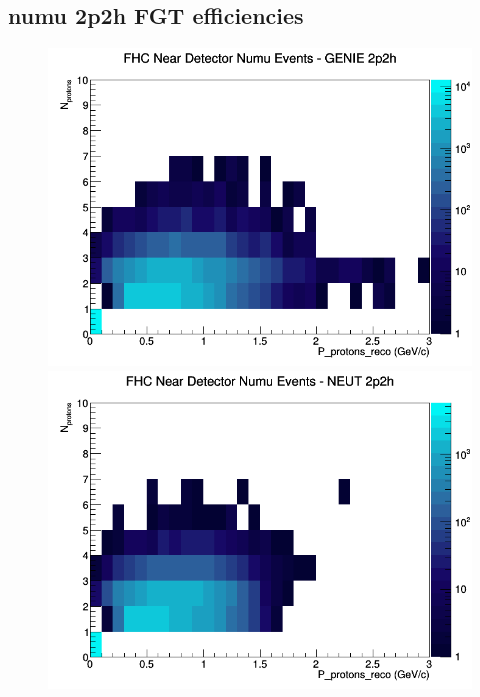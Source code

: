 \documentclass[12pt]{article}
\begin{document}
\subsection{numu 2p2h FGT efficiencies}
\begin{figure}[h]
\includegraphics[width=\linewidth]{eff_N_P/FGT/protons/2p2h_FHC_ND_numu_N_P_GENIE.png}
\endminipage
{}
\includegraphics[width=\linewidth]{eff_N_P/FGT/protons/2p2h_FHC_ND_numu_N_P_NEUT.png}
\endminipage
{}

\end{figure}
\end{document}
